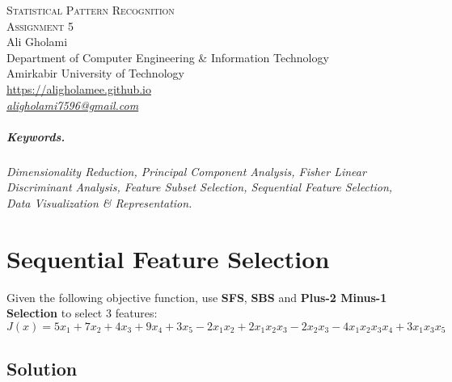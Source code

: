 \documentclass[12pt]{article}
\numberwithin{equation}{section}
\numberwithin{table}{section}
\numberwithin{figure}{section}
\begin{document}

\begin{center}
\textsc{\Large Statistical Pattern Recognition} \\[2pt]
	\textsc{\large Assignment 5}\\
	\vspace{0.5cm}
  Ali Gholami \\[6pt]
  Department of Computer Engineering \& Information Technology\\
  Amirkabir University of Technology  \\[6pt]
  \def\UrlFont{\em}
  \url{https://aligholamee.github.io}\\
    \href{mailto:aligholami7596@gmail.com}{\textit{aligholami7596@gmail.com}}
\end{center}

\begin{abstract}

\end{abstract}

\subparagraph{Keywords.} \textit{Dimensionality Reduction, Principal Component Analysis, Fisher Linear Discriminant Analysis, Feature Subset Selection, Sequential Feature Selection, Data Visualization \& Representation.}


\section{Sequential Feature Selection}
Given the following objective function, use \textbf{SFS}, \textbf{SBS} and \textbf{Plus-2 Minus-1 Selection} to select 3 features:
$$
	J(x) = 5x_1 + 7x_2 + 4x_3 + 9x_4 + 3x_5 -2x_1x_2 + 2x_1x_2x_3 - 2x_2x_3 - 4x_1x_2x_3x_4 + 3x_1x_3x_5
$$
\subsection*{Solution}
\end{document}
